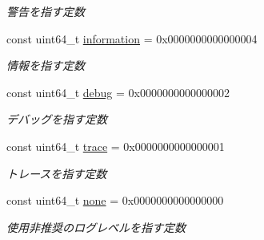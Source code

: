 \begin{DoxyCompactItemize}
\begin{DoxyCompactList}\small\item\em 警告を指す定数 \end{DoxyCompactList}\item 
\mbox{\label{namespace_g_a_1_1loglevel_a6815fbf833f109a73f2c0bfc950f3541}} 
const uint64\+\_\+t \mbox{\hyperlink{namespace_g_a_1_1loglevel_a6815fbf833f109a73f2c0bfc950f3541}{information}} = 0x00\textquotesingle{}00\textquotesingle{}00\textquotesingle{}00\textquotesingle{}00\textquotesingle{}00\textquotesingle{}00\textquotesingle{}04
\begin{DoxyCompactList}\small\item\em 情報を指す定数 \end{DoxyCompactList}\item 
\mbox{\label{namespace_g_a_1_1loglevel_aa4c41c7c0eac6c12a0c38a3dd1e143b0}} 
const uint64\+\_\+t \mbox{\hyperlink{namespace_g_a_1_1loglevel_aa4c41c7c0eac6c12a0c38a3dd1e143b0}{debug}} = 0x00\textquotesingle{}00\textquotesingle{}00\textquotesingle{}00\textquotesingle{}00\textquotesingle{}00\textquotesingle{}00\textquotesingle{}02
\begin{DoxyCompactList}\small\item\em デバッグを指す定数 \end{DoxyCompactList}\item 
\mbox{\label{namespace_g_a_1_1loglevel_a02a2b6d92ecc953e8a50d8371912698f}} 
const uint64\+\_\+t \mbox{\hyperlink{namespace_g_a_1_1loglevel_a02a2b6d92ecc953e8a50d8371912698f}{trace}} = 0x00\textquotesingle{}00\textquotesingle{}00\textquotesingle{}00\textquotesingle{}00\textquotesingle{}00\textquotesingle{}00\textquotesingle{}01
\begin{DoxyCompactList}\small\item\em トレースを指す定数 \end{DoxyCompactList}\item 
\mbox{\label{namespace_g_a_1_1loglevel_a2e5555cd209d73ca7eb60a2164fdaf1c}} 
const uint64\+\_\+t \mbox{\hyperlink{namespace_g_a_1_1loglevel_a2e5555cd209d73ca7eb60a2164fdaf1c}{none}} = 0x00\textquotesingle{}00\textquotesingle{}00\textquotesingle{}00\textquotesingle{}00\textquotesingle{}00\textquotesingle{}00\textquotesingle{}00
\begin{DoxyCompactList}\small\item\em 使用非推奨のログレベルを指す定数 \end{DoxyCompactList}\end{DoxyCompactItemize}


